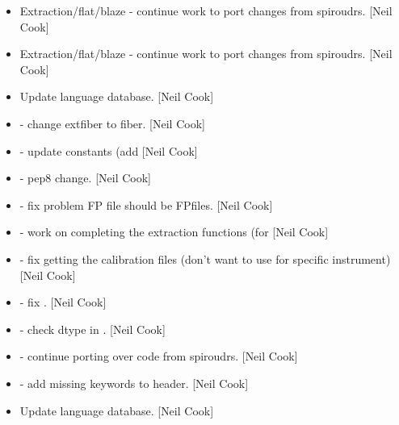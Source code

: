 \documentclass[a4paper,10pt,english]{report}
\begin{document}
\label{\detokenize{misc/changelog:id103}}\begin{itemize}
\item {} 
Extraction/flat/blaze - continue work to port changes from spiroudrs.
{[}Neil Cook{]}

\item {} 
Extraction/flat/blaze - continue work to port changes from spiroudrs.
{[}Neil Cook{]}

\item {} 
Update language database. {[}Neil Cook{]}

\item {} 
 - change \textendash{}extfiber to \textendash{}fiber. {[}Neil Cook{]}

\item {} 
 - update constants (add  {[}Neil Cook{]}

\item {} 
 - pep8 change. {[}Neil Cook{]}

\item {} 
 - fix problem FP file should be FPfiles.
{[}Neil Cook{]}

\item {} 
 - work on completing the extraction functions (for
 {[}Neil Cook{]}

\item {} 
 - fix getting the calibration files (don’t want
to use  for specific instrument) {[}Neil Cook{]}

\item {} 
 - fix . {[}Neil Cook{]}

\item {} 
 - check dtype in . {[}Neil
Cook{]}

\item {} 
 - continue porting over code from spiroudrs. {[}Neil
Cook{]}

\item {} 
 - add missing keywords to header. {[}Neil Cook{]}

\item {} 
Update language database. {[}Neil Cook{]}


\end{itemize}
\end{document}
